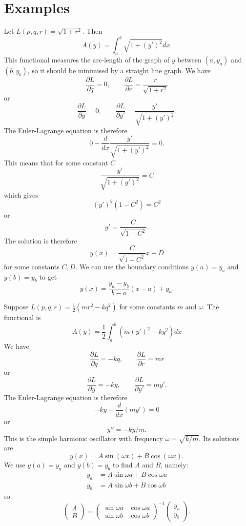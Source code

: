 \section{Examples}

\begin{exm}
Let $L(p,q,r)=\sqrt{1+r^2}$. Then
\[A(y)=\int_a^b\sqrt{1+(y')^2}dx.\]
This functional measures the arc-length of the graph of $y$ between $(a,y_a)$ and $(b,y_b)$, so it should be minimised by a straight line graph. We have
\[\frac{\partial L}{\partial q}=0,\qquad\frac{\partial L}{\partial r}=\frac{r}{\sqrt{1+r^2}}\]
or
\[\frac{\partial L}{\partial y}=0,\qquad\frac{\partial L}{\partial y'}=\frac{y'}{\sqrt{1+(y')^2}}.\]
The Euler-Lagrange equation is therefore
\[0-\frac{d}{dx}\frac{y'}{\sqrt{1+(y')^2}}=0.\]
This means that for some constant $C$
\[\frac{y'}{\sqrt{1+(y')^2}}=C\]
which gives
\[(y')^2(1-C^2)=C^2\]
or
\[y'=\frac{C}{\sqrt{1-C^2}}.\]
The solution is therefore
\[y(x)=\frac{C}{\sqrt{1-C^2}}x+D\]
for some constants $C,D$. We can use the boundary conditions $y(a)=y_a$ and $y(b)=y_b$ to get
\[y(x)=\frac{y_a-y_b}{b-a}(x-a)+y_a.\]
\end{exm}
\begin{exm}
Suppose $L(p,q,r)=\frac{1}{2}(mr^2-kq^2)$ for some constants $m$ and $\omega$. The functional is
\[A(y)=\frac{1}{2}\int_a^b\left(m(y')^2-ky^2\right)dx\]
We have
\[\frac{\partial L}{\partial q}=-kq,\qquad\frac{\partial L}{\partial r}=mr\]
or
\[\frac{\partial L}{\partial y}=-ky,\qquad\frac{\partial L}{\partial y'}=my'.\]
The Euler-Lagrange equation is therefore
\[-ky-\frac{d}{dx}(my')=0\]
or
\[y''=-ky/m.\]
This is the simple harmonic oscillator with frequency $\omega=\sqrt{k/m}$. Its solutions are
\[y(x)=A\sin(\omega x)+B\cos(\omega x).\]
We use $y(a)=y_a$ and $y(b)=y_b$ to find $A$ and $B$, namely:
\begin{align*}
y_a&=A\sin\omega a+B\cos\omega a\\
y_b&=A\sin\omega b+B\cos\omega b
\end{align*}
so
\[\left(\begin{array}{c}A \\ B\end{array}\right)=\left(\begin{array}{cc}
\sin\omega a & \cos\omega a\\
\sin \omega b & \cos\omega b
\end{array}\right)^{-1}\left(\begin{array}{c}y_a \\ y_b\end{array}\right).\]
\end{exm}

